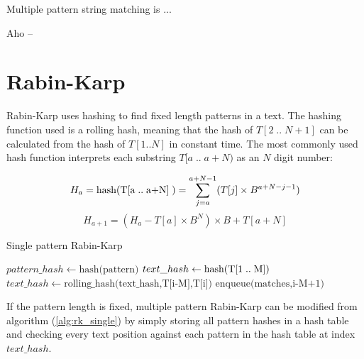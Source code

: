 \documentclass[final]{beamer}
\author{Aleksi Hartikainen and Jussi Kokkala}
\begin{document}
\begin{poster}

\newcolumn

Multiple pattern string matching is ...

Aho --

\section{Rabin-Karp}
      Rabin-Karp uses hashing to find fixed length patterns in a text. The hashing function used is a rolling hash, meaning that the hash of $T[2\;..\;N+1]$ can be calculated from the hash of $T[1..N]$ in constant time.  The most commonly used hash function interprets each substring $T[a\;..\;a+N)$ as an $N$ digit number:
      \vspace{-18mm}
\begin{figure}[H]
\small
\label{fig:hash}
\begin{equation*}
H_a = \text{hash(T[a\;..\;a+N]\;)} = \sum_{j=a}^{a+N-1}(T[j] \times B^{a+N-j-1})
\end{equation*}
      \vspace{-4mm}
\begin{equation*}
H_{a+1} = (H_a - T[a]\times B^{N}) \times B + T[a+N] 
\end{equation*}
\end{figure}
\vspace{10mm}
\begin{algorithm} [H]
\small
\caption{Single pattern Rabin-Karp}
\label{alg:rk_single}

\begin{algorithmic}[1]

\State $pattern\_hash \gets \text{hash(pattern)}$
\State $text\_hash \gets \text{hash(T[1\;..\;M])}$
        \State  $text\_hash \gets \text{rolling\_hash(text\_hash,T[i-M],T[i])}$
    \EndIf
            \State $\text{enqueue(matches,i-M+1)}$
        \EndIf
    \EndIf
\EndFor
\end{algorithmic}
\end{algorithm}

If the pattern length is fixed, multiple pattern Rabin-Karp can be modified from algorithm (\ref{alg:rk_single}) by simply storing all pattern hashes in a hash table and checking every text position against each pattern in the hash table at index $text\_hash$.


\end{poster}
\end{document}
